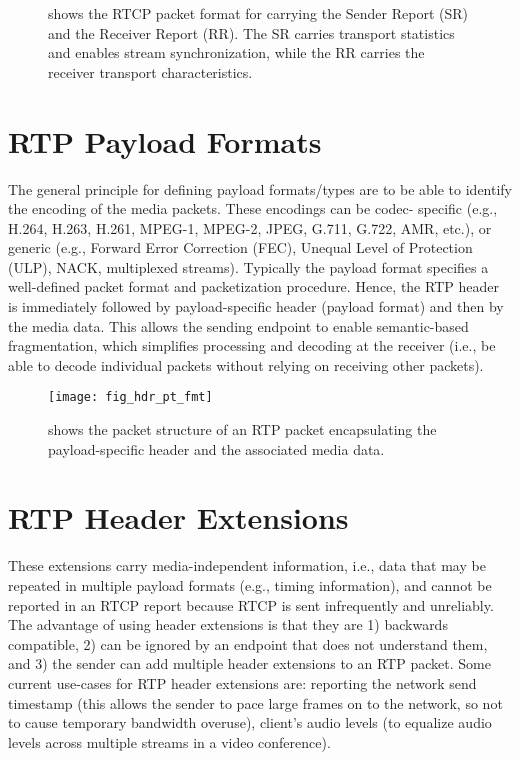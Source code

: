 \begin{figure}[!h]
\caption{shows the RTCP packet format for carrying the Sender Report (SR) and
the Receiver Report (RR). The SR carries transport statistics and enables 
stream synchronization, while the RR carries the receiver transport 
characteristics.}
\label{fig:3:rtcp.hdr}
\end{figure}

\section{RTP Payload Formats}

The general principle for defining payload formats/types are to be able to
identify the encoding of the media packets. These encodings can be codec-
specific (e.g., H.264, H.263, H.261, MPEG-1, MPEG-2, JPEG, G.711, G.722, AMR,
etc.), or generic (e.g., Forward Error Correction (FEC), Unequal Level of
Protection (ULP), NACK, multiplexed streams). Typically the payload format
specifies a well-defined packet format and packetization procedure. Hence, the
RTP header is immediately followed by payload-specific header (payload format)
and then by the media data. This allows the sending endpoint to enable
semantic-based fragmentation, which simplifies processing and decoding at the
receiver (i.e., be able to decode individual packets without relying on
receiving other packets).

\begin{figure}[!h]
\centerline{\texttt{[image: fig\_hdr\_pt\_fmt]}}
\caption{shows the packet structure of an RTP packet encapsulating the
payload-specific header and the associated media data.}
\label{fig:3:pt.fmt}
\end{figure}

\section{RTP Header Extensions}

These extensions carry media-independent information, i.e., data that may be
repeated in multiple payload formats (e.g., timing information), and cannot be
reported in an RTCP report because RTCP is sent infrequently and unreliably.
The advantage of using header extensions is that they are 1) backwards
compatible, 2) can be ignored by an endpoint that does not understand them,
and 3) the sender can add multiple header extensions to an RTP packet. Some
current use-cases for RTP header extensions are: reporting the network send
timestamp (this allows the sender to pace large frames on to the network, so
not to cause temporary bandwidth overuse), client's audio levels (to equalize
audio levels across multiple streams in a video conference).

